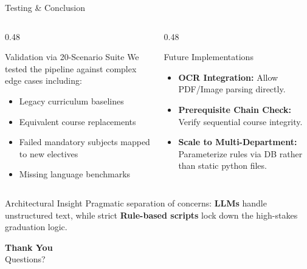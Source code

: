 \documentclass[aspectratio=169]{beamer}
\begin{document}
\begin{frame}{Testing \& Conclusion}
  \begin{columns}[T]
    \begin{column}{0.48\textwidth}
      \begin{block}{Validation via 20-Scenario Suite}
        We tested the pipeline against complex edge cases including:
        \begin{itemize}
          \scriptsize
          \item Legacy curriculum baselines
          \item Equivalent course replacements
          \item Failed mandatory subjects mapped to new electives
          \item Missing language benchmarks
        \end{itemize}
      \end{block}
    \end{column}
    \begin{column}{0.48\textwidth}
      \begin{block}{Future Implementations}
        \begin{itemize}
          \scriptsize
          \item \textbf{OCR Integration:} Allow PDF/Image parsing directly.
          \item \textbf{Prerequisite Chain Check:} Verify sequential course integrity.
          \item \textbf{Scale to Multi-Department:} Parameterize rules via DB rather than static python files.
        \end{itemize}
      \end{block}
    \end{column}
  \end{columns}
  \vspace{0.8em}
  \begin{block}{Architectural Insight}
    \small Pragmatic separation of concerns: \textbf{LLMs} handle unstructured text, while strict \textbf{Rule-based scripts} lock down the high-stakes graduation logic.
  \end{block}
\end{frame}

\begin{frame}{}
  \begin{center}
    \vspace{2em}
    {\Huge\bfseries Thank You}\\[1em]
    {\large Questions?}\\[2em]
  \end{center}
\end{frame}
\end{document}
